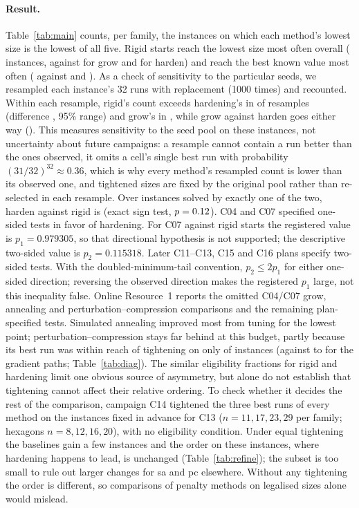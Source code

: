 \paragraph{Result.} Table~\ref{tab:main} counts, per family, the instances on which each method's lowest size is the lowest of all five. Rigid starts reach the lowest size most often overall (\CsevenRigidLowest{} instances, against \CsevenGrowLowest{} for grow and \CsevenHardenLowest{} for harden) and reach the best known value most often (\CsevenRigidSolved{} against \CsevenGrowSolved{} and \CsevenHardenSolved{}). As a check of sensitivity to the particular seeds, we resampled each instance's 32 runs with replacement (1000 times) and recounted. Within each resample, rigid's count exceeds hardening's in \BootDRHPos{} of resamples (difference \BootDRH, 95\% range) and grow's in \BootDRGPos{}, while grow against harden goes either way (\BootDGH). This measures sensitivity to the seed pool on these instances, not uncertainty about future campaigns: a resample cannot contain a run better than the ones observed, it omits a cell's single best run with probability $(31/32)^{32}\approx0.36$, which is why every method's resampled count is lower than its observed one, and tightened sizes are fixed by the original pool rather than re-selected in each resample. Over instances solved by exactly one of the two, harden against rigid is \CsevenSignRigid{} (exact sign test, $p=0.12$). C04 and C07 specified one-sided tests in favor of hardening. For C07 against rigid starts the registered value is $p_1=0.979305$, so that directional hypothesis is not supported; the descriptive two-sided value is $p_2=0.115318$. Later C11--C13, C15 and C16 plans specify two-sided tests. With the doubled-minimum-tail convention, $p_2\le2p_1$ for either one-sided direction; reversing the observed direction makes the registered $p_1$ large, not this inequality false. Online Resource~1 reports the omitted C04/C07 grow, annealing and perturbation--compression comparisons and the remaining plan-specified tests. Simulated annealing improved most from tuning for the lowest point; perturbation--compression stays far behind at this budget, partly because its best run was within reach of tightening on only \EligPc{} of instances (against \EligHarden{} to \EligRigid{} for the gradient paths; Table~\ref{tab:diag}). The similar eligibility fractions for rigid and hardening limit one obvious source of asymmetry, but alone do not establish that tightening cannot affect their relative ordering. To check whether it decides the rest of the comparison, campaign C14 tightened the three best runs of every method on the \RefN{} instances fixed in advance for C13 ($n=11,17,23,29$ per family; hexagons $n=8,12,16,20$), with no eligibility condition. Under equal tightening the baselines gain a few instances and the order on these \RefN{} instances, where hardening happens to lead, is unchanged (Table~\ref{tab:refine}); the subset is too small to rule out larger changes for sa and pc elsewhere. Without any tightening the order is different, so comparisons of penalty methods on legalised sizes alone would mislead.

